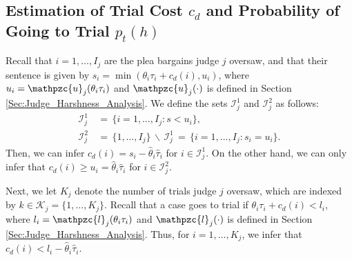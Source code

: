 \documentclass[11pt, oneside]{article}   	%
\theoremstyle{ModifiedStyle}
\begin{document}
\subsection{Estimation of Trial Cost $c_d$ and Probability of Going to Trial $p_t(h)$}
Recall that $i=1,\ldots,I_j$ are the plea bargains judge $j$ oversaw, and that their sentence is given by $s_i=\min(\theta_i\tau_i+c_d(i),u_i)$, where $u_i = \mathpzc{u}_j(\theta_i\tau_i)$ and $\mathpzc{u}_j(\cdot)$ is defined in Section \ref{Sec:Judge_Harshness_Analysis}. We define the sets $\mathcal{I}_j^1$ and $\mathcal{I}_j^2$ as follows:
	\begin{align*}
		\mathcal{I}_j^1 &\,=\, \{i=1,\ldots,I_j: s < u_i\}, \\
		\mathcal{I}_j^2 &\,=\, \{1,\ldots,I_j\} \,\backslash\, \mathcal{I}_j^1 \,=\, \{i=1,\ldots,I_j:s_i=u_i\}.
	\end{align*}
	Then, we can infer $c_d(i) = s_i - \hat{\theta}_i\hat{\tau}_i$ for $i\in\mathcal{I}_j^1$. On the other hand, we can only infer that $c_d(i) \geq u_i = \hat{\theta}_i\hat{\tau}_i$ for $i\in\mathcal{I}^2_j$.

Next, we let $K_j$ denote the number of trials judge $j$ oversaw, which are indexed by $k \in \mathcal{K}_j = \{1,\ldots,K_j\}$. Recall that a case goes to trial if $\theta_i\tau_i+c_d(i)<l_i$, where $l_i=\mathpzc{l}_j(\theta_i\tau_i)$ and $\mathpzc{l}_j(\cdot)$ is defined in Section \ref{Sec:Judge_Harshness_Analysis}. Thus, for $i=1,\ldots,K_j$, we infer that $c_d(i) < l_i-\hat{\theta}_i\hat{\tau}_i$.
\end{document}
